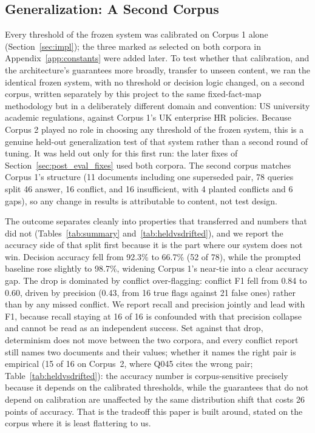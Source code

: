 \documentclass[conference]{IEEEtran}
\begin{document}
\subsection{Generalization: A Second Corpus}
\label{sec:corpus2}
Every threshold of the frozen system was calibrated on Corpus 1 alone
(Section~\ref{sec:impl}); the three marked as selected on both corpora in
Appendix~\ref{app:constants} were added later. To test whether that calibration, and the
architecture's guarantees more broadly, transfer to unseen content, we ran
the identical frozen system, with no threshold or decision logic changed,
on a second corpus, written separately by this project to the same fixed-fact-map
methodology but in a deliberately different domain and convention: US
university academic regulations, against Corpus 1's UK enterprise HR
policies. Because Corpus 2 played no role in choosing any threshold of the frozen
system, this is a genuine held-out generalization test of that system rather
than a second round of tuning. It was held out only for this first run: the
later fixes of Section~\ref{sec:post_eval_fixes} used both corpora.
The second corpus matches Corpus 1's structure
(11 documents including one superseded pair, 78 queries split 46 answer, 16
conflict, and 16 insufficient, with 4 planted conflicts and 6 gaps), so any
change in results is attributable to content, not test design.

The outcome separates cleanly into properties that transferred and numbers
that did not (Tables~\ref{tab:summary} and~\ref{tab:heldvsdrifted}), and we report the accuracy side of
that split first because it is the part where our system does not win.
Decision accuracy fell from 92.3\% to
66.7\% (52 of 78), while the prompted baseline rose slightly to 98.7\%,
widening Corpus 1's near-tie into a clear accuracy gap. The drop is dominated
by conflict over-flagging: conflict F1 fell from 0.84 to 0.60, driven by
precision (0.43, from 16 true flags against 21 false ones) rather than by any
missed conflict. We report recall and precision jointly and lead with F1,
because recall staying at 16 of 16 is confounded with that precision collapse
and cannot be read as an independent success. Set against that drop,
determinism does not move between the two corpora, and every conflict
report still names two documents and their values; whether it names the
right pair is empirical (15 of 16 on Corpus~2, where Q045 cites the wrong
pair; Table~\ref{tab:heldvsdrifted}): the accuracy number is corpus-sensitive
precisely because it depends on the calibrated thresholds, while the
guarantees that do not depend on calibration are unaffected by the same
distribution shift that costs 26 points of accuracy. That is the tradeoff
this paper is built around, stated on the corpus where it is least
flattering to us.
\end{document}
